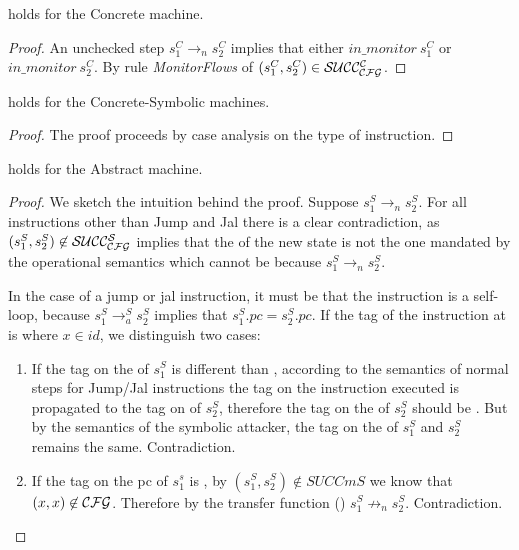 \begin{lemma}
  \label{cfg_nocheck_CS}
   holds for the Concrete machine.
\end{lemma}
\begin{proof}
  An unchecked step $s^C_1 \to_n s^C_2$ implies
  that either $in\_monitor~s^C_1$ or $in\_monitor~s^C_2$.
  By rule \emph{MonitorFlows} of 
  $(s^C_1,s^C_2) \in \mathcal{SUCC_\mathcal{CFG}^{C}}$.
\end{proof}

\begin{lemma}
  \label{cfg_equiv_CS}
   holds for the Concrete-Symbolic machines.
\end{lemma}
\begin{proof}
  The proof proceeds by case analysis on the type
  of instruction. 
\end{proof}

\begin{lemma}
  \label{av_no_attacker_S}
   holds for the Abstract machine.
\end{lemma}
\begin{proof}
  
  We sketch the intuition behind the proof.  Suppose $s^S_1 \to_n
  s^S_2$.  For all instructions other than Jump and Jal there is a
  clear contradiction, as $(s^S_1,s^S_2) \not \in \mathcal{SUCC_\mathcal{CFG}^{S}}$ implies
  that the \pc of the new state is not the one mandated by the
  operational semantics which cannot be because $s^S_1 \to_n
  s^S_2$.  
  
  In the case of a jump or jal instruction, it must be that the
  instruction is a self-loop, because $s^S_1 \to^{S}_a s^S_2$
  implies that $s^S_1.pc = s^S_2.pc$. 
  If the tag of the instruction at \pc is  where
  $x \in id$, we distinguish two cases:

  \begin{enumerate}
    \item If the tag on the \pc of $s^S_1$ is different than
      , according to the semantics of normal steps
      for Jump/Jal instructions the tag on the instruction executed
      is propagated to the tag on \pc of $s^S_2$, therefore the tag on
      the \pc of $s^S_2$ should be . But by
      the semantics of the symbolic attacker, the tag on the \pc
      of $s^S_1$ and $s^S_2$ remains the same. Contradiction.
    \item If the tag on the pc of $s^s_1$ is , 
      by $(s^S_1,s^S_2) \not \in SUCCm{S}$ we know that
      $(x,x) \not \in \mathcal{CFG}$. Therefore by the transfer
      function () $s^S_1 \not \to_n s^S_2$.
      Contradiction.
    \end{enumerate}
\end{proof}

